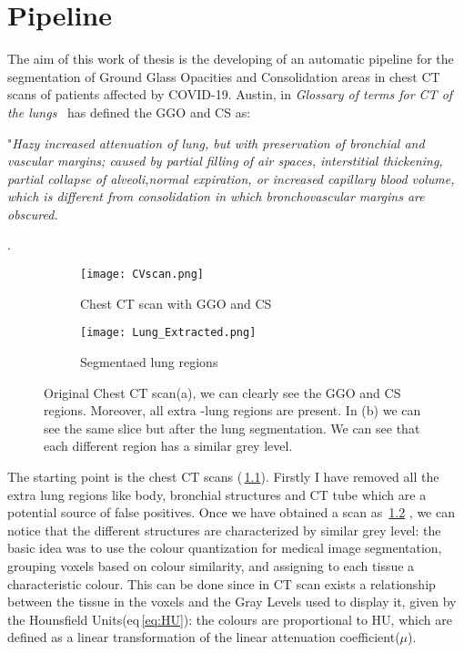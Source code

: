 \documentclass{standalone}
\begin{document}
	\chapter{Pipeline}
	
 	The aim of this work of thesis is the developing of an automatic pipeline for the segmentation of Ground Glass Opacities and Consolidation areas in chest CT scans of patients affected by COVID-19. Austin, in \textit{Glossary of terms for CT of the lungs}~\cite{ART:Austin} has defined the GGO and CS as:
 	
	\begin{center}
		"\emph{Hazy increased attenuation of lung, but with preservation of bronchial and vascular margins; caused by partial filling of air spaces, interstitial thickening, partial collapse of alveoli,normal expiration, or increased capillary blood volume, which is different from consolidation in which bronchovascular margins are obscured.}
	\end{center}. 

	\begin{figure}[ht]
		\begin{subfigure}{.5\textwidth}
			\centering
			\texttt{[image: CVscan.png]}  
			\caption{Chest CT scan with GGO and CS}
			\label{fig:CTscan}
		\end{subfigure}
		\begin{subfigure}{.5\textwidth}
			\centering
			\texttt{[image: Lung\_Extracted.png]}  
			\caption{Segmentaed lung regions}
			\label{fig:lung}
		\end{subfigure}
		\caption{Original Chest CT scan(a), we can clearly see the GGO and CS regions. Moreover, all extra -lung regions are present. In (b) we can see the same slice but after the lung segmentation. We can see that each different region has a similar grey level.}
		\label{fig:CTLung}
	\end{figure}

	The starting point is the chest CT scans (\figurename\,\ref{fig:CTscan}). Firstly I have removed all the extra lung regions like body, bronchial structures and CT tube which are a potential source of false positives. Once we have obtained a scan as \figurename\,\ref{fig:lung} , we can notice that the different structures are characterized by similar grey level: the basic idea was to use the colour quantization for medical image segmentation, grouping voxels based on colour similarity, and assigning to each tissue a characteristic colour. This can be done since in CT scan exists a relationship between the tissue in the voxels and the Gray Levels used to display it, given by the Hounsfield Units(eq\,\ref{eq:HU}): the colours are proportional to HU, which are defined as a linear transformation of the linear attenuation coefficient($\mu$).
\end{document}
